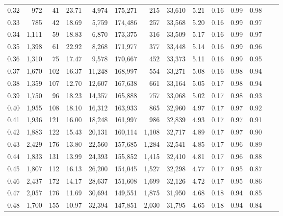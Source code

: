 \begin{tabular}{rrrrrrrrrrrrrr}
0.32 &    972 &     41 &   23.71 &    4,974 &  175,271 &     215 &  33,610 &  5.21 &  0.16 &  0.99 &      0.98 \\
0.33 &    785 &     42 &   18.69 &    5,759 &  174,486 &     257 &  33,568 &  5.20 &  0.16 &  0.99 &      0.97 \\
0.34 &  1,111 &     59 &   18.83 &    6,870 &  173,375 &     316 &  33,509 &  5.17 &  0.16 &  0.99 &      0.97 \\
0.35 &  1,398 &     61 &   22.92 &    8,268 &  171,977 &     377 &  33,448 &  5.14 &  0.16 &  0.99 &      0.96 \\
0.36 &  1,310 &     75 &   17.47 &    9,578 &  170,667 &     452 &  33,373 &  5.11 &  0.16 &  0.99 &      0.95 \\
0.37 &  1,670 &    102 &   16.37 &   11,248 &  168,997 &     554 &  33,271 &  5.08 &  0.16 &  0.98 &      0.94 \\
0.38 &  1,359 &    107 &   12.70 &   12,607 &  167,638 &     661 &  33,164 &  5.05 &  0.17 &  0.98 &      0.94 \\
0.39 &  1,750 &     96 &   18.23 &   14,357 &  165,888 &     757 &  33,068 &  5.02 &  0.17 &  0.98 &      0.93 \\
0.40 &  1,955 &    108 &   18.10 &   16,312 &  163,933 &     865 &  32,960 &  4.97 &  0.17 &  0.97 &      0.92 \\
0.41 &  1,936 &    121 &   16.00 &   18,248 &  161,997 &     986 &  32,839 &  4.93 &  0.17 &  0.97 &      0.91 \\
0.42 &  1,883 &    122 &   15.43 &   20,131 &  160,114 &   1,108 &  32,717 &  4.89 &  0.17 &  0.97 &      0.90 \\
0.43 &  2,429 &    176 &   13.80 &   22,560 &  157,685 &   1,284 &  32,541 &  4.85 &  0.17 &  0.96 &      0.89 \\
0.44 &  1,833 &    131 &   13.99 &   24,393 &  155,852 &   1,415 &  32,410 &  4.81 &  0.17 &  0.96 &      0.88 \\
0.45 &  1,807 &    112 &   16.13 &   26,200 &  154,045 &   1,527 &  32,298 &  4.77 &  0.17 &  0.95 &      0.87 \\
0.46 &  2,437 &    172 &   14.17 &   28,637 &  151,608 &   1,699 &  32,126 &  4.72 &  0.17 &  0.95 &      0.86 \\
0.47 &  2,057 &    176 &   11.69 &   30,694 &  149,551 &   1,875 &  31,950 &  4.68 &  0.18 &  0.94 &      0.85 \\
0.48 &  1,700 &    155 &   10.97 &   32,394 &  147,851 &   2,030 &  31,795 &  4.65 &  0.18 &  0.94 &      0.84 \\

\end{tabular}
